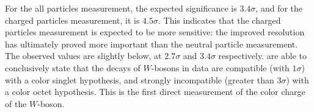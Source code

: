 For the all particles measurement, the expected significance is $3.4\sigma$, and for the charged particles measurement, it is $4.5\sigma$. This indicates that the charged particles measurement is expected to be more sensitive: the improved resolution has ultimately proved more important than the neutral particle measurement. The observed values are slightly below, at $2.7\sigma$ and $3.4\sigma$ respectively. are able to conclusively state that the decays of $W$-bosons in data are compatible (with $1\sigma$) with a color singlet hypothesis, and strongly incompatible (greater than $3\sigma$) with a color octet hypothesis. This is the first direct measurement of the color charge of the $W$-boson.




